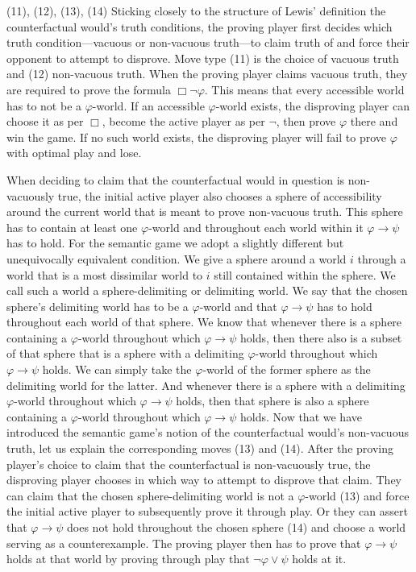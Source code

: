 \documentclass[a4paper,american,10pt]{paper}
\theoremstyle{definition}\newtheorem{lemma}[thm]{Lemma}
\theoremstyle{definition}\newtheorem{proposition}[thm]{Proposition}
\theoremstyle{definition}\newtheorem{corollary}[thm]{Corollary}
\theoremstyle{definition}\newtheorem{definition}{Definition}
\begin{document}
(11), (12), (13), (14) Sticking closely to the structure of Lewis' definition the counterfactual would's truth conditions, the proving player first decides which truth condition---vacuous or non-vacuous truth---to claim truth of and force their opponent to attempt to disprove. Move type (11) is the choice of vacuous truth and (12) non-vacuous truth. When the proving player claims vacuous truth, they are required to prove the formula $\Box\neg\varphi$. This means that every accessible world has to not be a $\varphi$-world. If an accessible $\varphi$-world exists, the disproving player can choose it as per $\Box$, become the active player as per $\neg$, then prove $\varphi$ there and win the game. If no such world exists, the disproving player will fail to prove $\varphi$ with optimal play and lose.

When deciding to claim that the counterfactual would in question is non-vacuously true, the initial active player also chooses a sphere of accessibility around the current world that is meant to prove non-vacuous truth. This sphere has to contain at least one $\varphi$-world and throughout each world within it $\varphi\rightarrow\psi$ has to hold. For the semantic game we adopt a slightly different but unequivocally equivalent condition. We give a sphere around a world $i$ through a world that is a most dissimilar world to $i$ still contained within the sphere. We call such a world a sphere-delimiting or delimiting world. We say that the chosen sphere's delimiting world has to be a $\varphi$-world and that $\varphi\rightarrow\psi$ has to hold throughout each world of that sphere. We know that whenever there is a sphere containing a $\varphi$-world throughout which $\varphi\rightarrow\psi$ holds, then there also is a subset of that sphere that is a sphere with a delimiting $\varphi$-world throughout which $\varphi\rightarrow\psi$ holds. We can simply take the $\varphi$-world of the former sphere as the delimiting world for the latter. And whenever there is a sphere with a delimiting $\varphi$-world throughout which $\varphi\rightarrow\psi$ holds, then that sphere is also a sphere containing a $\varphi$-world throughout which $\varphi\rightarrow\psi$ holds. Now that we have introduced the semantic game's notion of the counterfactual would's non-vacuous truth, let us explain the corresponding moves (13) and (14). After the proving player's choice to claim that the counterfactual is non-vacuously true, the disproving player chooses in which way to attempt to disprove that claim. They can claim that the chosen sphere-delimiting world is not a $\varphi$-world (13) and force the initial active player to subsequently prove it through play. Or they can assert that $\varphi\rightarrow\psi$ does not hold throughout the chosen sphere (14) and choose a world serving as a counterexample. The proving player then has to prove that $\varphi\rightarrow\psi$ holds at that world by proving through play that $\neg\varphi\vee\psi$ holds at it.
\end{document}
